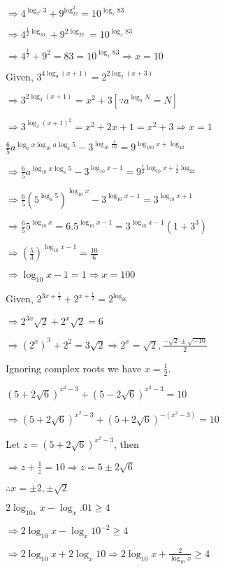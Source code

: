   $\Rightarrow 4^{\log_{3^2}3} + 9^{\log_22^2} = 10^{\log_x83}$

  $\Rightarrow 4^{\tfrac{1}{2}\log_33} + 9^{2\log_22} = 10^{\log_x83}$

  $\Rightarrow 4^{\tfrac{1}{2}} + 9^2 = 83 = 10^{\log_x83}\Rightarrow x = 10$
\item Given, $3^{4\log_9(x + 1)} = 2^{2\log_2(x + 3)}$

  $\Rightarrow 3^{2\log_3(x + 1)} = x^2 + 3 [\because a^{\log_aN} = N]$

  $\Rightarrow 3^{\log_3(x + 1)^2} = x^2 + 2x + 1 = x^2 + 3 \Rightarrow x = 1$
\item $\frac{6}{5}a^{\log_ax\log_{10}a\log_a5} - 3^{\log_{10}\tfrac{x}{10}} = 9^{\log_{100}x + \log_42}$

  $\Rightarrow \frac{6}{5}a^{\log_{10}x\log_a5} - 3^{\log_{10}x - 1} = 9^{\tfrac{1}{2}\log_{10}x + \tfrac{1}{2}\log_22}$

  $\Rightarrow \frac{6}{5}\left(5^{\log_a5}\right)^{\log_{10}x} - 3^{\log_{10}x - 1} = 3^{\log_{10}x + 1}$

  $\Rightarrow \frac{6}{5}5^{\log_{10}x} = 6.5^{\log_{10}x - 1} = 3^{\log_{10}x - 1}(1 + 3^3)$

  $\Rightarrow \left(\frac{5}{3}\right)^{\log_{10}x - 1} = \frac{10}{6}$

  $\Rightarrow \log_{10}x - 1 = 1\Rightarrow x = 100$
\item Given, $2^{3x + \tfrac{1}{2}} + 2^{x + \tfrac{1}{2}} = 2^{\log_26}$

  $\Rightarrow 2^{3x}\sqrt{2} + 2^x\sqrt{2} = 6$

  $\Rightarrow (2^x)^3 + 2^2 = 3\sqrt{2} \Rightarrow 2^x = \sqrt{2}, \frac{-\sqrt{2} \pm \sqrt{-10}}{2}$

  Ignoring complex roots we have $x = \frac{1}{2}$.
\item $(5 + 2\sqrt{6})^{x^2 - 3} + (5 - 2\sqrt{6})^{x^2 - 3} = 10$

  $\Rightarrow (5 + 2\sqrt{6})^{x^2 - 3} + (5 + 2\sqrt{6})^{-(x^2 - 3)} = 10$

  Let $z = (5 + 2\sqrt{6})^{x^2 - 3}$, then

  $\Rightarrow z + \frac{1}{z} = 10 \Rightarrow z = 5\pm2\sqrt{6}$

  $\therefore x = \pm2, \pm\sqrt{2}$
\item $2\log_{10x}x - \log_x{.01}\geq 4$

  $\Rightarrow 2\log_{10}x - \log_x10^{-2} \geq 4$

  $\Rightarrow 2\log_{10}x + 2\log_x10 \Rightarrow 2\log_{10}x + \frac{2}{\log_{10}x}\geq 4$

